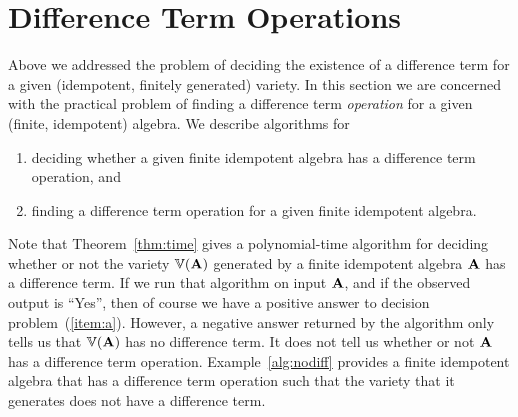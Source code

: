 \documentclass{ws-ijac}
\begin{document}
\section{Difference Term Operations}
Above we addressed the problem of deciding the existence of a difference term
for a given (idempotent, finitely generated) variety.  In this section we are
concerned with the practical problem of finding a difference term
\emph{operation} for a given (finite, idempotent) algebra.
We describe algorithms for
\begin{enumerate}
\item \label{item:a} deciding whether a given finite idempotent algebra
has a difference term operation, and
\item \label{item:b} finding a difference term operation
for a given finite idempotent algebra.
\end{enumerate}
Note that Theorem~\ref{thm:time} gives a polynomial-time algorithm
for deciding whether or not the variety $\operatorname{\mathbb{V}}(\mathbf{A})$ generated by a
finite idempotent algebra $\mathbf{A}$ has a difference term.
If we run that algorithm on input $\mathbf{A}$, and if the observed
output is ``Yes'', then of course we have a positive answer to decision
problem~(\ref{item:a}).  However, a negative answer returned by the
algorithm only tells us that $\operatorname{\mathbb{V}}(\mathbf{A})$ has no difference term.
It does not tell us whether or not $\mathbf{A}$ has a difference term operation.  Example~\ref{alg:nodiff} provides a finite idempotent algebra that has a difference term operation such that the variety that it generates does not have a difference term.

\end{document}
